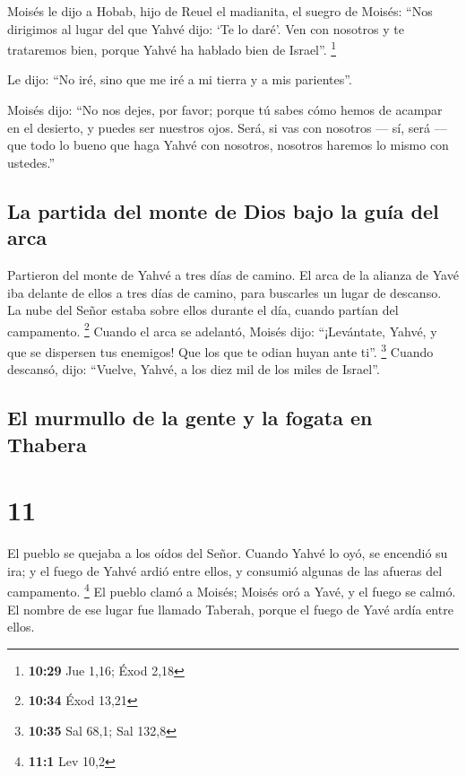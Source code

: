  Moisés le dijo a Hobab, hijo de Reuel el madianita, el
suegro de Moisés: ``Nos dirigimos al lugar del que Yahvé dijo: `Te lo
daré'. Ven con nosotros y te trataremos bien, porque Yahvé ha hablado
bien de Israel''. \footnote{\textbf{10:29} Jue 1,16; Éxod 2,18}

 Le dijo: ``No iré, sino que me iré a mi tierra y a mis
parientes''.

 Moisés dijo: ``No nos dejes, por favor; porque tú sabes
cómo hemos de acampar en el desierto, y puedes ser nuestros ojos.
 Será, si vas con nosotros --- sí, será --- que todo lo
bueno que haga Yahvé con nosotros, nosotros haremos lo mismo con
ustedes.''

\hypertarget{la-partida-del-monte-de-dios-bajo-la-guuxeda-del-arca}{%
\subsection{La partida del monte de Dios bajo la guía del
arca}\label{la-partida-del-monte-de-dios-bajo-la-guuxeda-del-arca}}

 Partieron del monte de Yahvé a tres días de camino. El
arca de la alianza de Yavé iba delante de ellos a tres días de camino,
para buscarles un lugar de descanso.  La nube del Señor
estaba sobre ellos durante el día, cuando partían del campamento.
\footnote{\textbf{10:34} Éxod 13,21}  Cuando el arca se
adelantó, Moisés dijo: ``¡Levántate, Yahvé, y que se dispersen tus
enemigos! Que los que te odian huyan ante ti''. \footnote{\textbf{10:35}
  Sal 68,1; Sal 132,8}  Cuando descansó, dijo: ``Vuelve,
Yahvé, a los diez mil de los miles de Israel''.

\hypertarget{el-murmullo-de-la-gente-y-la-fogata-en-thabera}{%
\subsection{El murmullo de la gente y la fogata en
Thabera}\label{el-murmullo-de-la-gente-y-la-fogata-en-thabera}}

\hypertarget{section-10}{%
\section{11}\label{section-10}}

 El pueblo se quejaba a los oídos del Señor. Cuando Yahvé
lo oyó, se encendió su ira; y el fuego de Yahvé ardió entre ellos, y
consumió algunas de las afueras del campamento. \footnote{\textbf{11:1}
  Lev 10,2}  El pueblo clamó a Moisés; Moisés oró a Yavé,
y el fuego se calmó.  El nombre de ese lugar fue llamado
Taberah, porque el fuego de Yavé ardía entre ellos.

